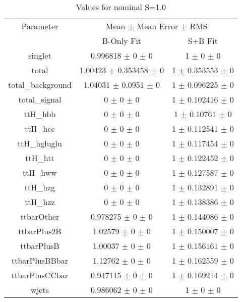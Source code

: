 \begin{table}
\centering
\caption{Values for nominal S=1.0}
\begin{tabular}{ccc}
\toprule
Parameter & \multicolumn{2}{c}{Mean $\pm$ Mean Error $\pm$ RMS}\\
 & B-Only Fit & S+B Fit\\
\midrule
singlet & \num{0.996818} $\pm$ \num{0} $\pm$ \num{0} & \num{1} $\pm$ \num{0} $\pm$ \num{0}\\
total & \num{1.00423} $\pm$ \num{0.353458} $\pm$ \num{0} & \num{1} $\pm$ \num{0.353553} $\pm$ \num{0}\\
total\_background & \num{1.04031} $\pm$ \num{0.0951} $\pm$ \num{0} & \num{1} $\pm$ \num{0.096225} $\pm$ \num{0}\\
total\_signal & \num{0} $\pm$ \num{0} $\pm$ \num{0} & \num{1} $\pm$ \num{0.102416} $\pm$ \num{0}\\
ttH\_hbb & \num{0} $\pm$ \num{0} $\pm$ \num{0} & \num{1} $\pm$ \num{0.10761} $\pm$ \num{0}\\
ttH\_hcc & \num{0} $\pm$ \num{0} $\pm$ \num{0} & \num{1} $\pm$ \num{0.112541} $\pm$ \num{0}\\
ttH\_hgluglu & \num{0} $\pm$ \num{0} $\pm$ \num{0} & \num{1} $\pm$ \num{0.117454} $\pm$ \num{0}\\
ttH\_htt & \num{0} $\pm$ \num{0} $\pm$ \num{0} & \num{1} $\pm$ \num{0.122452} $\pm$ \num{0}\\
ttH\_hww & \num{0} $\pm$ \num{0} $\pm$ \num{0} & \num{1} $\pm$ \num{0.127587} $\pm$ \num{0}\\
ttH\_hzg & \num{0} $\pm$ \num{0} $\pm$ \num{0} & \num{1} $\pm$ \num{0.132891} $\pm$ \num{0}\\
ttH\_hzz & \num{0} $\pm$ \num{0} $\pm$ \num{0} & \num{1} $\pm$ \num{0.138386} $\pm$ \num{0}\\
ttbarOther & \num{0.978275} $\pm$ \num{0} $\pm$ \num{0} & \num{1} $\pm$ \num{0.144086} $\pm$ \num{0}\\
ttbarPlus2B & \num{1.02579} $\pm$ \num{0} $\pm$ \num{0} & \num{1} $\pm$ \num{0.150007} $\pm$ \num{0}\\
ttbarPlusB & \num{1.00037} $\pm$ \num{0} $\pm$ \num{0} & \num{1} $\pm$ \num{0.156161} $\pm$ \num{0}\\
ttbarPlusBBbar & \num{1.12762} $\pm$ \num{0} $\pm$ \num{0} & \num{1} $\pm$ \num{0.162559} $\pm$ \num{0}\\
ttbarPlusCCbar & \num{0.947115} $\pm$ \num{0} $\pm$ \num{0} & \num{1} $\pm$ \num{0.169214} $\pm$ \num{0}\\
wjets & \num{0.986062} $\pm$ \num{0} $\pm$ \num{0} & \num{1} $\pm$ \num{0} $\pm$ \num{0}\\
\bottomrule
\end{tabular}
\end{table}